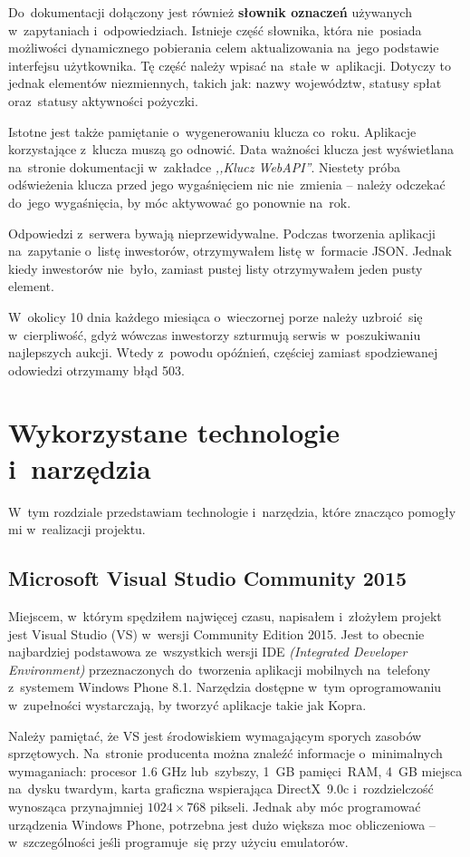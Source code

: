 \documentclass[a4paper,twoside,titlepage,openright]{book}
\begin{document}
Do~dokumentacji dołączony jest również \textbf{słownik oznaczeń} używanych w~zapytaniach i~odpowiedziach. Istnieje część słownika, która nie~posiada możliwości dynamicznego pobierania celem aktualizowania na~jego podstawie interfejsu użytkownika. Tę część należy wpisać na~stałe w~aplikacji. Dotyczy to jednak elementów niezmiennych, takich jak: nazwy województw, statusy spłat oraz~statusy aktywności pożyczki. 

Istotne jest także pamiętanie o~wygenerowaniu klucza co~roku. Aplikacje korzystające z~klucza muszą go odnowić. Data ważności klucza jest wyświetlana na~stronie dokumentacji w~zakładce \textit{,,Klucz WebAPI''}. Niestety próba odświeżenia klucza przed jego wygaśnięciem nic nie~zmienia -- należy odczekać do~jego wygaśnięcia, by móc aktywować go ponownie na~rok. 

Odpowiedzi z~serwera bywają nieprzewidywalne. Podczas tworzenia aplikacji na~zapytanie o~listę inwestorów, otrzymywałem listę w~formacie JSON. Jednak kiedy inwestorów nie~było, zamiast pustej listy otrzymywałem jeden pusty element. 

W~okolicy 10 dnia każdego miesiąca o~wieczornej porze należy uzbroić~się w~cierpliwość, gdyż wówczas inwestorzy szturmują serwis w~poszukiwaniu najlepszych aukcji. Wtedy z~powodu opóźnień, częściej zamiast spodziewanej odowiedzi otrzymamy błąd 503.


\chapter{Wykorzystane technologie i~narzędzia}
W~tym rozdziale przedstawiam technologie i~narzędzia, które znacząco pomogły mi w~realizacji projektu.

\section{Microsoft Visual Studio Community 2015}
Miejscem, w~którym spędziłem najwięcej czasu, napisałem i~złożyłem projekt jest Visual Studio (VS) w~wersji Community Edition 2015. Jest to obecnie najbardziej podstawowa ze~wszystkich wersji IDE \textit{(Integrated Developer Environment)} przeznaczonych do~tworzenia aplikacji mobilnych na~telefony z~systemem Windows Phone 8.1. Narzędzia dostępne w~tym oprogramowaniu w~zupełności wystarczają, by tworzyć aplikacje takie jak Kopra. 

Należy pamiętać, że VS jest środowiskiem wymagającym sporych zasobów sprzętowych. Na~stronie producenta \cite{vs} można znaleźć informacje o~minimalnych wymaganiach: procesor 1.6 GHz lub~szybszy, 1~GB pamięci~RAM, 4~GB miejsca na~dysku twardym, karta graficzna wspierająca DirectX~9.0c i~rozdzielczość wynosząca przynajmniej $ 1024 \times 768 $ pikseli. Jednak aby móc programować urządzenia Windows Phone, potrzebna jest dużo większa moc obliczeniowa -- w~szczególności jeśli programuje~się przy użyciu emulatorów.
\end{document}
